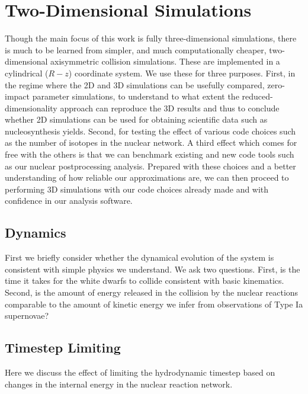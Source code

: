 \documentclass[twocolumn,numberedappendix]{../aastex6}
\begin{document}
\section{Two-Dimensional Simulations}
\label{sec:2D}

Though the main focus of this work is fully three-dimensional simulations,
there is much to be learned from simpler, and much computationally cheaper,
two-dimensional axisymmetric collision simulations. These are implemented
in a cylindrical ($R-z$) coordinate system. We use these for three purposes.
First, in the regime where the 2D and 3D simulations can be usefully compared, 
zero-impact parameter simulations, to understand to what extent the
reduced-dimensionality approach can reproduce the 3D results and thus to
conclude whether 2D simulations can be used for obtaining scientific data
such as nucleosynthesis yields. Second, for testing the effect of various
code choices such as the number of isotopes in the nuclear network. A third
effect which comes for free with the others is that we can benchmark existing
and new code tools such as our nuclear postprocessing analysis. Prepared
with these choices and a better understanding of how reliable our approximations
are, we can then proceed to performing 3D simulations with our code choices
already made and with confidence in our analysis software.

\subsection{Dynamics}
\label{sec:2D:dynamics}

First we briefly consider whether the dynamical evolution of the system
is consistent with simple physics we understand. We ask two questions.
First, is the time it takes for the white dwarfs to collide consistent with
basic kinematics. Second, is the amount of energy released in the
collision by the nuclear reactions comparable to the amount of kinetic
energy we infer from observations of Type Ia supernovae?

\subsection{Timestep Limiting}
\label{sec:2D:timestep}

Here we discuss the effect of limiting the hydrodynamic timestep based on
changes in the internal energy in the nuclear reaction network.
\end{document}
